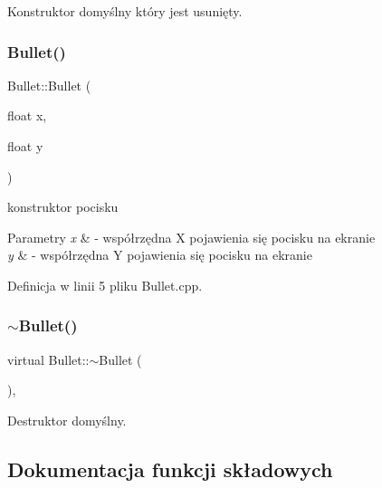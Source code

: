 Konstruktor domyślny który jest usunięty. 

\mbox{\label{class_bullet_a9e0d7efa717b245dec0f436d5b3fe0c1}} 
\subsubsection{\texorpdfstring{Bullet()}{Bullet()}\hspace{0.1cm}{\footnotesize\ttfamily [2/2]}}
{\footnotesize\ttfamily Bullet\+::\+Bullet (\begin{DoxyParamCaption}\item[{float}]{x,  }\item[{float}]{y }\end{DoxyParamCaption})}



konstruktor pocisku 


\begin{DoxyParams}{Parametry}
{\em x} & -\/ współrzędna X pojawienia się pocisku na ekranie \\
\hline
{\em y} & -\/ współrzędna Y pojawienia się pocisku na ekranie \\
\hline
\end{DoxyParams}


Definicja w linii 5 pliku Bullet.\+cpp.

\mbox{\label{class_bullet_a051f364dc1951449fc0a3eb50537e681}} 
\subsubsection{\texorpdfstring{$\sim$\+Bullet()}{~Bullet()}}
{\footnotesize\ttfamily virtual Bullet\+::$\sim$\+Bullet (\begin{DoxyParamCaption}{ }\end{DoxyParamCaption})\hspace{0.3cm}{\ttfamily [virtual]}, {\ttfamily [default]}}



Destruktor domyślny. 



\subsection{Dokumentacja funkcji składowych}
\mbox{\label{class_bullet_a36d1d889cfc8095dcd9631a766b35cf0}} 
